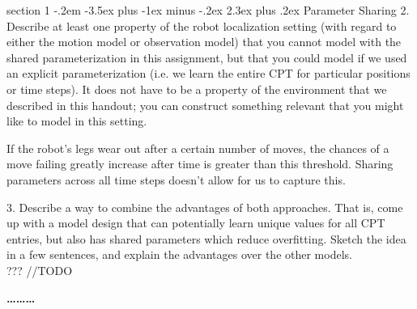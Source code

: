 \documentclass[12pt]{article}
\makeatletter
\newenvironment{problem}{\@startsection
       {section}
       {1}
       {-.2em}
       {-3.5ex plus -1ex minus -.2ex}
       {2.3ex plus .2ex}
       {\pagebreak[3]%
       \large\bf\noindent{Problem }
       }
       }
       {%
       \begin{center}\large\bf \ldots\ldots\ldots\end{center}}
\makeatother
\begin{document}
\begin{problem}{Parameter Sharing}
2. Describe at least one property of the robot localization setting (with regard
to either the motion model or observation model) that you cannot model with the shared
parameterization in this assignment, but that you could model if we used an explicit
parameterization (i.e. we learn the entire CPT for particular positions or time steps). It
does not have to be a property of the environment that we described in this handout; you
can construct something relevant that you might like to model in this setting.

If the robot's legs wear out after a certain number of moves, the 
chances of a move failing greatly increase after time is greater than
this threshold.  Sharing parameters across all time steps doesn't allow
for us to capture this.

3. Describe a way to combine the advantages of both approaches. That is, come
up with a model design that can potentially learn unique values for all CPT entries, but
also has shared parameters which reduce overfitting. Sketch the idea in a few sentences,
and explain the advantages over the other models.\\

??? //TODO



\end{problem}{}
\end{document}
